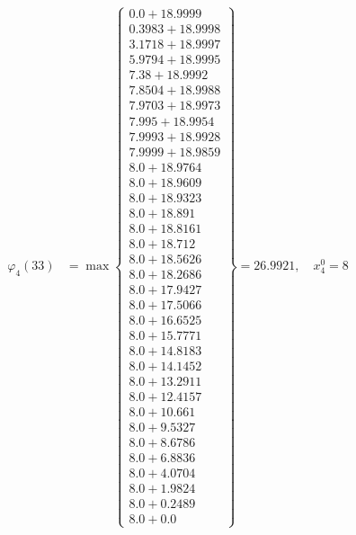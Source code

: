 \documentclass{article}
\begin{document}
\begin{align*}
\varphi_{4}(33) &= \max \left\{ \begin{array}{c}
0.0 + 18.9999 \\
 0.3983 + 18.9998 \\
 3.1718 + 18.9997 \\
 5.9794 + 18.9995 \\
 7.38 + 18.9992 \\
 7.8504 + 18.9988 \\
 7.9703 + 18.9973 \\
 7.995 + 18.9954 \\
 7.9993 + 18.9928 \\
 7.9999 + 18.9859 \\
 8.0 + 18.9764 \\
 8.0 + 18.9609 \\
 8.0 + 18.9323 \\
 8.0 + 18.891 \\
 8.0 + 18.8161 \\
 8.0 + 18.712 \\
 8.0 + 18.5626 \\
 8.0 + 18.2686 \\
 8.0 + 17.9427 \\
 8.0 + 17.5066 \\
 8.0 + 16.6525 \\
 8.0 + 15.7771 \\
 8.0 + 14.8183 \\
 8.0 + 14.1452 \\
 8.0 + 13.2911 \\
 8.0 + 12.4157 \\
 8.0 + 10.661 \\
 8.0 + 9.5327 \\
 8.0 + 8.6786 \\
 8.0 + 6.8836 \\
 8.0 + 4.0704 \\
 8.0 + 1.9824 \\
 8.0 + 0.2489 \\
 8.0 + 0.0
\end{array} \right\}=26.9921, \quad x_{4}^0=8\\
  

\end{align*}
\end{document}
